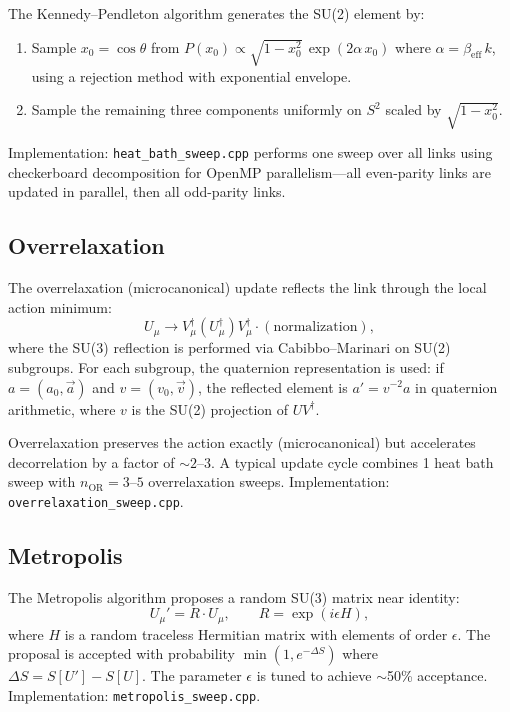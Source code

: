 \documentclass[12pt]{article}
\newcommand{\code}[1]{\texttt{#1}}
\begin{document}
The Kennedy--Pendleton algorithm generates the SU(2) element by:
\begin{enumerate}
\item Sample $x_0 = \cos\theta$ from $P(x_0) \propto \sqrt{1 - x_0^2} \, \exp(2\alpha \, x_0)$ where $\alpha = \beta_{\mathrm{eff}} \, k$, using a rejection method with exponential envelope.
\item Sample the remaining three components uniformly on $S^2$ scaled by $\sqrt{1 - x_0^2}$.
\end{enumerate}

Implementation: \code{heat\_bath\_sweep.cpp} performs one sweep over all links using checkerboard decomposition for OpenMP parallelism---all even-parity links are updated in parallel, then all odd-parity links.

\subsection{Overrelaxation}
\label{sec:overrelax}

The overrelaxation (microcanonical) update reflects the link through the local action minimum:
\begin{equation}
\label{eq:overrelax}
U_\mu \to V_\mu^\dagger (U_\mu^\dagger) V_\mu^\dagger \cdot (\text{normalization}),
\end{equation}
where the SU(3) reflection is performed via Cabibbo--Marinari on SU(2) subgroups. For each subgroup, the quaternion representation is used: if $a = (a_0, \vec{a})$ and $v = (v_0, \vec{v})$, the reflected element is $a' = v^{-2} a$ in quaternion arithmetic, where $v$ is the SU(2) projection of $U V^\dagger$.

Overrelaxation preserves the action exactly (microcanonical) but accelerates decorrelation by a factor of $\sim 2$--$3$. A typical update cycle combines 1 heat bath sweep with $n_{\mathrm{OR}} = 3$--$5$ overrelaxation sweeps. Implementation: \code{overrelaxation\_sweep.cpp}.

\subsection{Metropolis}
\label{sec:metropolis}

The Metropolis algorithm proposes a random SU(3) matrix near identity:
\begin{equation}
U_\mu' = R \cdot U_\mu, \qquad R = \exp(i\epsilon H),
\end{equation}
where $H$ is a random traceless Hermitian matrix with elements of order $\epsilon$. The proposal is accepted with probability $\min(1, e^{-\Delta S})$ where $\Delta S = S[U'] - S[U]$. The parameter $\epsilon$ is tuned to achieve $\sim$50\% acceptance. Implementation: \code{metropolis\_sweep.cpp}.
\end{document}
